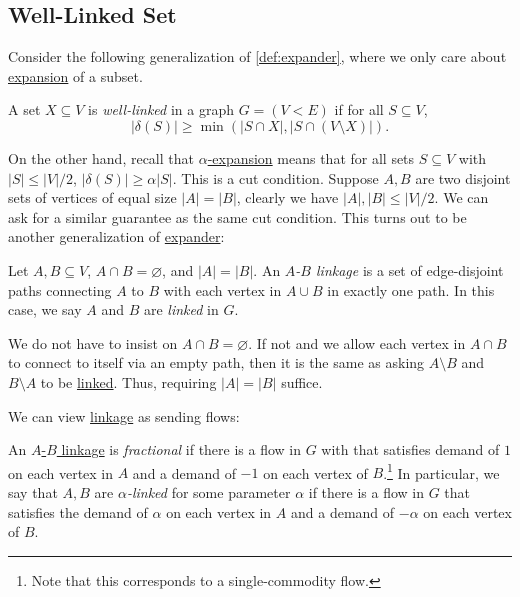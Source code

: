 \subsection{Well-Linked Set}
Consider the following generalization of \autoref{def:expander}, where we only care about \hyperref[def:expansion]{expansion} of a subset.

\begin{definition}\label{def:well-linked}
	A set \(X \subseteq V\) is \emph{well-linked} in a graph \(G = (V< E)\) if for all \(S \subseteq V\),
	\[
		\lvert \delta (S) \rvert
		\geq \min (\lvert S \cap X \rvert , \lvert S \cap (V \setminus X) \rvert ).
	\]
\end{definition}

On the other hand, recall that \hyperref[def:expansion]{\(\alpha \)-expansion} means that for all sets \(S \subseteq V\) with \(\lvert S \rvert \leq \lvert V \rvert / 2\), \(\lvert \delta (S) \rvert \geq \alpha \lvert S \rvert \). This is a cut condition. Suppose \(A, B\) are two disjoint sets of vertices of equal size \(\lvert A \rvert = \lvert B \rvert \), clearly we have \(\lvert A \rvert , \lvert B \rvert \leq \lvert V \rvert / 2\). We can ask for a similar guarantee as the same cut condition. This turns out to be another generalization of \hyperref[def:expander]{expander}:

\begin{definition}[Linkage]\label{def:linkage}
	Let \(A, B \subseteq V\), \(A \cap B = \varnothing \), and \(\lvert A \rvert = \lvert B \rvert \). An \emph{\(A\)-\(B\) linkage} is a set of edge-disjoint paths connecting \(A\) to \(B\) with each vertex in \(A \cup B\) in exactly one path. In this case, we say \(A\) and \(B\) are \emph{linked} in \(G\).
\end{definition}

\begin{note}
	We do not have to insist on \(A \cap B = \varnothing \). If not and we allow each vertex in \(A \cap B\) to connect to itself via an empty path, then it is the same as asking \(A\setminus B\) and \(B\setminus A\) to be \hyperref[def:linkage]{linked}. Thus, requiring \(\lvert A \rvert = \lvert B \rvert \) suffice.
\end{note}

We can view \hyperref[def:linkage]{linkage} as sending flows:

\begin{definition}\label{def:fractional-linkage}
	An \hyperref[def:linkage]{\(A\)-\(B\) linkage} is \emph{fractional} if there is a flow in \(G\) with that satisfies demand of \(1\) on each vertex in \(A\) and a demand of \(-1\) on each vertex of \(B\).\footnote{Note that this corresponds to a single-commodity flow.} In particular, we say that \(A, B\) are \emph{\(\alpha \)-linked} for some parameter \(\alpha \) if there is a flow in \(G\) that satisfies the demand of \(\alpha \) on each vertex in \(A\) and a demand of \(-\alpha \) on each vertex of \(B\).
\end{definition}


